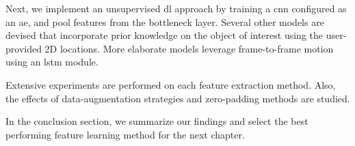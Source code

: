 Next, we implement an unsupervised \gls{dl} approach by training a \gls{cnn} configured as an \gls{ae}, and pool features from the bottleneck layer.
Several other models are devised that incorporate prior knowledge on the object of interest using the user-provided 2D locations.
More elaborate models leverage frame-to-frame motion using an \gls{lstm} module.

Extensive experiments are performed on each feature extraction method.
Also, the effects of data-augmentation strategies and zero-padding methods are studied.

In the conclusion section, we summarize our findings and select the best performing feature learning method for the next chapter.

\endinput

